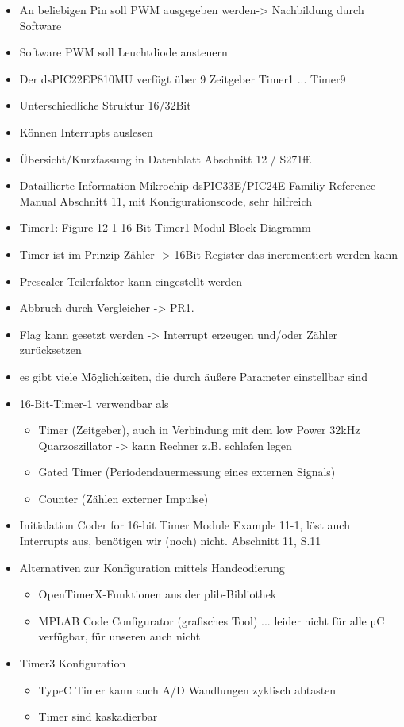 \begin{itemize}%
	\item An beliebigen Pin soll PWM ausgegeben werden-> Nachbildung durch Software
	\item Software PWM soll Leuchtdiode ansteuern
	\item Der dsPIC22EP810MU verfügt über 9 Zeitgeber Timer1 ... Timer9
	\item Unterschiedliche Struktur 16/32Bit
	\item Können Interrupts auslesen
	\item Übersicht/Kurzfassung in Datenblatt Abschnitt 12 / S271ff.
	\item Dataillierte Information Mikrochip dsPIC33E/PIC24E Familiy Reference Manual Abschnitt 11, mit Konfigurationscode, sehr hilfreich
	\item Timer1: Figure 12-1 16-Bit Timer1 Modul Block Diagramm
	\item Timer ist im Prinzip Zähler -> 16Bit Register das incrementiert werden kann
	\item Prescaler Teilerfaktor kann eingestellt werden
	\item Abbruch durch Vergleicher -> PR1. 
	\item Flag kann gesetzt werden -> Interrupt erzeugen und/oder Zähler zurücksetzen
	\item es gibt viele Möglichkeiten, die durch äußere Parameter einstellbar sind
	\item 16-Bit-Timer-1 verwendbar als
	\begin{itemize}
		\item Timer (Zeitgeber), auch in Verbindung mit dem low Power 32kHz Quarzoszillator -> kann Rechner z.B. schlafen legen
		\item Gated Timer (Periodendauermessung eines externen Signals)
		\item Counter (Zählen externer Impulse)
	\end{itemize}
	\item Initialation Coder for 16-bit Timer Module Example 11-1, löst auch Interrupts aus, benötigen wir (noch) nicht. Abschnitt 11, S.11
	\item Alternativen zur Konfiguration mittels Handcodierung
	\begin{itemize}
		\item OpenTimerX-Funktionen aus der plib-Bibliothek
		\item MPLAB Code Configurator (grafisches Tool) ... leider nicht für alle µC verfügbar, für unseren auch nicht
	\end{itemize}
	\item Timer3 Konfiguration
	\begin{itemize}
		\item TypeC Timer kann auch A/D Wandlungen zyklisch abtasten
		\item Timer sind kaskadierbar
	\end{itemize}
\end{itemize}

